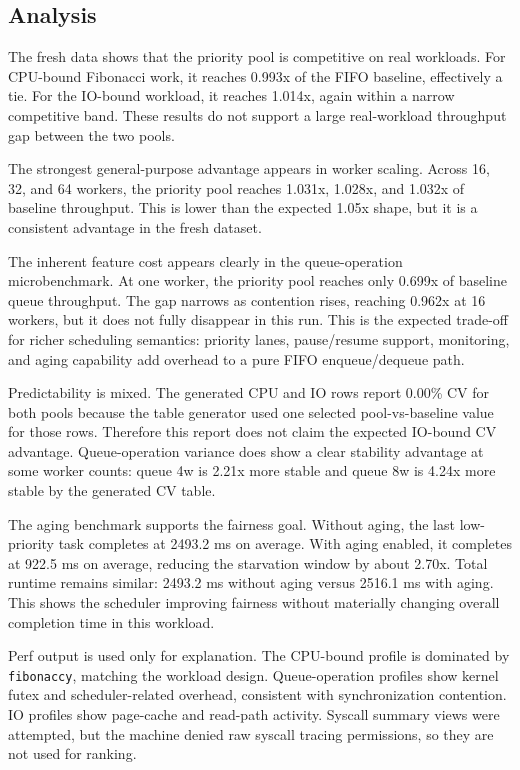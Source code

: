 \subsection{Analysis}

The fresh data shows that the priority pool is competitive on real workloads.
For CPU-bound Fibonacci work, it reaches 0.993x of the FIFO baseline, effectively
a tie. For the IO-bound workload, it reaches 1.014x, again within a narrow
competitive band. These results do not support a large real-workload throughput
gap between the two pools.

The strongest general-purpose advantage appears in worker scaling. Across 16,
32, and 64 workers, the priority pool reaches 1.031x, 1.028x, and 1.032x of
baseline throughput. This is lower than the expected 1.05x shape, but it is a
consistent advantage in the fresh dataset.

The inherent feature cost appears clearly in the queue-operation microbenchmark.
At one worker, the priority pool reaches only 0.699x of baseline queue throughput.
The gap narrows as contention rises, reaching 0.962x at 16 workers, but it does
not fully disappear in this run. This is the expected trade-off for richer
scheduling semantics: priority lanes, pause/resume support, monitoring, and
aging capability add overhead to a pure FIFO enqueue/dequeue path.

Predictability is mixed. The generated CPU and IO rows report 0.00\% CV for both
pools because the table generator used one selected pool-vs-baseline value for
those rows. Therefore this report does not claim the expected IO-bound CV
advantage. Queue-operation variance does show a clear stability advantage at
some worker counts: queue 4w is 2.21x more stable and queue 8w is 4.24x more
stable by the generated CV table.

The aging benchmark supports the fairness goal. Without aging, the last
low-priority task completes at 2493.2 ms on average. With aging enabled, it
completes at 922.5 ms on average, reducing the starvation window by about 2.70x.
Total runtime remains similar: 2493.2 ms without aging versus 2516.1 ms with
aging. This shows the scheduler improving fairness without materially changing
overall completion time in this workload.

Perf output is used only for explanation. The CPU-bound profile is dominated by
\texttt{fibonaccy}, matching the workload design. Queue-operation profiles show
kernel futex and scheduler-related overhead, consistent with synchronization
contention. IO profiles show page-cache and read-path activity. Syscall summary
views were attempted, but the machine denied raw syscall tracing permissions, so
they are not used for ranking.
